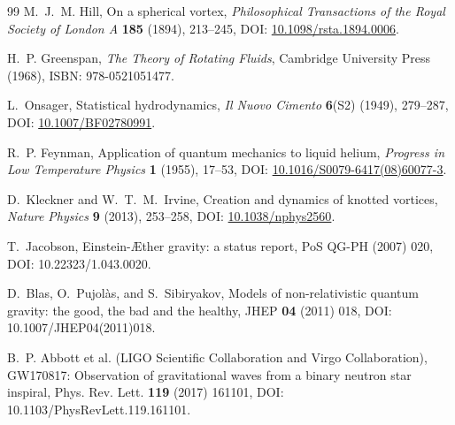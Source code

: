 \documentclass[11pt]{article}
\theoremstyle{definition}
\theoremstyle{plain}
\theoremstyle{remark}
\begin{document}
\begin{thebibliography}{99}
            M.~J.~M. Hill,
            \newblock On a spherical vortex,
            \newblock \emph{Philosophical Transactions of the Royal Society of London A} \textbf{185} (1894), 213--245,
            \newblock DOI: \href{https://doi.org/10.1098/rsta.1894.0006}{10.1098/rsta.1894.0006}.

            H.~P. Greenspan,
            \newblock \emph{The Theory of Rotating Fluids},
            \newblock Cambridge University Press (1968),
            \newblock ISBN: 978-0521051477.

            L.~Onsager,
            \newblock Statistical hydrodynamics,
            \newblock \emph{Il Nuovo Cimento} \textbf{6}(S2) (1949), 279--287,
            \newblock DOI: \href{https://doi.org/10.1007/BF02780991}{10.1007/BF02780991}.

            R.~P. Feynman,
            \newblock Application of quantum mechanics to liquid helium,
            \newblock \emph{Progress in Low Temperature Physics} \textbf{1} (1955), 17--53,
            \newblock DOI: \href{https://doi.org/10.1016/S0079-6417(08)60077-3}{10.1016/S0079-6417(08)60077-3}.

            D.~Kleckner and W.~T.~M.~Irvine,
            \newblock Creation and dynamics of knotted vortices,
            \newblock \emph{Nature Physics} \textbf{9} (2013), 253--258,
            \newblock DOI: \href{https://doi.org/10.1038/nphys2560}{10.1038/nphys2560}.

            T.~Jacobson,
            \newblock Einstein-\AE ther gravity: a status report,
            \newblock PoS QG-PH (2007) 020,
            \newblock DOI: 10.22323/1.043.0020.

            D.~Blas, O.~Pujol\`as, and S.~Sibiryakov,
            \newblock Models of non-relativistic quantum gravity: the good, the bad and the healthy,
            \newblock JHEP \textbf{04} (2011) 018,
            \newblock DOI: 10.1007/JHEP04(2011)018.

            B.~P. Abbott et al. (LIGO Scientific Collaboration and Virgo Collaboration),
            \newblock GW170817: Observation of gravitational waves from a binary neutron star inspiral,
            \newblock Phys. Rev. Lett. \textbf{119} (2017) 161101,
            \newblock DOI: 10.1103/PhysRevLett.119.161101.


\end{thebibliography}
\end{document}
